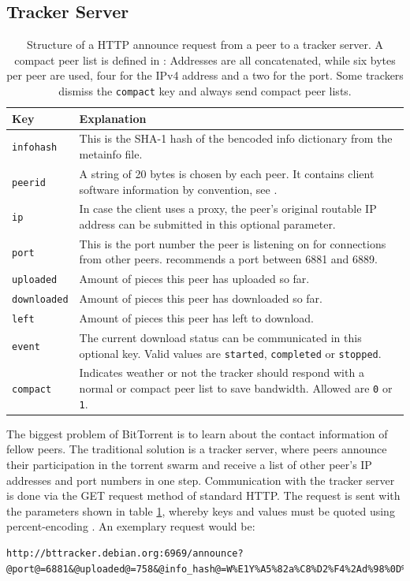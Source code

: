 \documentclass[10pt, a4paper, twoside=false, headsepline]{scrbook}
\renewcommand{\_}{\origunderscore\allowbreak}
\begin{document}
\subsection{Tracker Server}
\label{tracker-server}
\begin{table}
\centering
\begin{tabularx}{\textwidth}{lX}
\toprule
Key & Explanation \\
\midrule
\texttt{info\_hash} & This is the SHA-1 hash of the bencoded info dictionary from the metainfo file. \\
\texttt{peer\_id} & A string of 20 bytes is chosen by each peer. It contains client software information by convention, see \cite{bep20}. \\
\texttt{ip} & In case the client uses a proxy, the peer's original routable IP address can be submitted in this optional parameter. \\
\texttt{port} & This is the port number the peer is listening on for connections from other peers. \cite{bep3} recommends a port between 6881 and 6889. \\
\texttt{uploaded} & Amount of pieces this peer has uploaded so far. \\
\texttt{downloaded} & Amount of pieces this peer has downloaded so far. \\
\texttt{left} & Amount of pieces this peer has left to download. \\
\texttt{event} & The current download status can be communicated in this optional key. Valid values are \texttt{started}, \texttt{completed} or \texttt{stopped}. \\
\texttt{compact} & Indicates weather or not the tracker should respond with a normal or compact peer list to save bandwidth. Allowed are \texttt{0} or \texttt{1}. \\
\bottomrule
\end{tabularx}
\caption[Structure of a HTTP announce request]{Structure of a HTTP announce request from a peer to a tracker server. A compact peer list is defined in \cite{bep23}: Addresses are all concatenated, while six bytes per peer are used, four for the IPv4 address and a two for the port. Some trackers dismiss the \texttt{compact} key and always send compact peer lists.}
\label{announce}
\end{table}

The biggest problem of BitTorrent is to learn about the contact information of fellow peers. The traditional solution is a tracker server, where peers announce their participation in the torrent swarm and receive a list of other peer's IP addresses and port numbers in one step. Communication with the tracker server is done via the GET request method of standard HTTP. The request is sent with the parameters shown in table \ref{announce}, whereby keys and values must be quoted using percent-encoding \cite[§~2.1]{percent}. An exemplary request would be:
\begin{lstlisting}
http://bttracker.debian.org:6969/announce?@port@=6881&@uploaded@=758&@info_hash@=W%E1Y%A5%82a%C8%D2%F4%2Ad%98%0D%2B%80%8E9%01%FC%F6&@peer_id@=hNsfr5PYlFtWO73yvSGX&@compact@=1&@event@=started&@left@=1896&@downloaded@=1896
\end{lstlisting}
\end{document}
